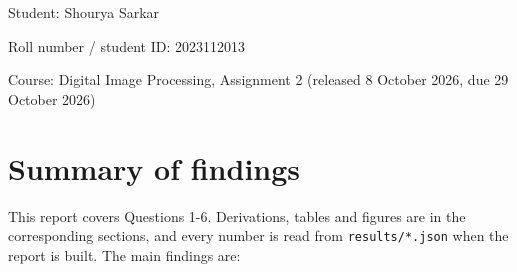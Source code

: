 \documentclass[10pt,a4paper]{article}
\begin{document}
\thispagestyle{empty}\begin{center}\vspace*{3cm}{\huge\bfseries Digital Image Processing - Assignment 2\par}\vspace{0.6cm}{\Large Questions 1-6: DFT, frequency-domain filtering, homomorphic filtering, edge-preserving smoothing, Wiener denoising and motion deblurring\par}\vspace{1.5cm}
{\large Student: Shourya Sarkar\par}\vspace{4pt}
{\large Roll number / student ID: 2023112013\par}\vspace{4pt}
{\large Course: Digital Image Processing, Assignment 2 (released 8 October 2026, due 29 October 2026)\par}\vspace{4pt}
\end{center}\newpage
\section{Summary of findings}
This report covers Questions 1-6. Derivations, tables and figures are in the corresponding sections, and every number is read from \texttt{results/\allowbreak{}}\texttt{*}\texttt{.\allowbreak{}json} when the report is built. The main findings are:
\end{document}
